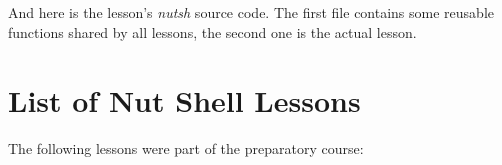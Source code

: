 \documentclass[paper=a4,twoside,abstract=on,cleardoublepage=empty,numbers=noenddot,toc=bib,12pt,appendixprefix=true]{scrreprt}
\begin{document}

%
And here is the lesson's \emph{nutsh} source code. The first file contains some reusable functions shared by all lessons, the second one is the actual lesson.



\label{lst:compress}


\chapter{List of Nut Shell Lessons}
\label{sec:lessons}

The following lessons were part of the preparatory course:
\end{document}

